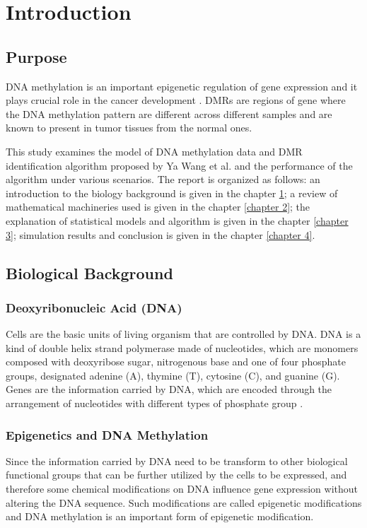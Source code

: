 \documentclass{report}
\begin{document}
 \tableofcontents
 
\chapter{Introduction} \label{chapter 1}
\section{Purpose}
\par
DNA methylation is an important epigenetic regulation of gene expression and it plays crucial role in the cancer development \cite{das2004dna}. DMRs are regions of gene where the DNA methylation pattern are different across different samples and are known to present in tumor tissues from the normal ones.
\par
This study examines the model of DNA methylation data and  DMR identification algorithm proposed by Ya Wang et al.\cite{wang2017accounting} and the performance of the algorithm under various scenarios. The report
is organized as follows: an introduction to the biology background is given in the chapter \ref{chapter 1}; a review of mathematical machineries used is given in the chapter \ref{chapter 2}; the explanation of statistical models and algorithm is given in the chapter \ref{chapter 3}; simulation results and conclusion is given in the chapter \ref{chapter 4}.


\section{Biological Background}

\subsection{Deoxyribonucleic Acid (DNA)}
\par 
Cells are the basic units of living organism that are controlled by DNA. DNA is a kind of double helix strand polymerase made of nucleotides, which are monomers composed with deoxyribose sugar, nitrogenous base and one of four phosphate groups, designated adenine (A), thymine (T), cytosine (C), and guanine (G).
Genes are the information carried by DNA, which are encoded through the arrangement of nucleotides with different types of phosphate group \cite{griffiths2005introduction}.


\subsection{Epigenetics and DNA Methylation} \label{subsection : M value}
\par 
Since the information carried by DNA need to be transform to other biological functional groups that can be further utilized by the cells to be expressed, and therefore some chemical modifications on DNA influence gene expression without altering the DNA sequence. 
Such modifications are called epigenetic modifications and DNA methylation is an important form of epigenetic modification.
\end{document}
